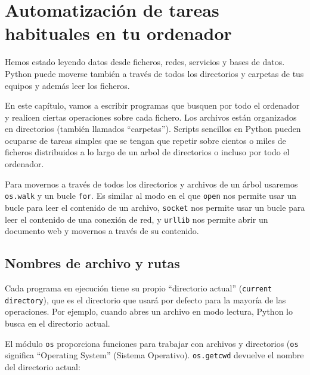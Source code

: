
\chapter{Automatización de tareas habituales en tu ordenador}

Hemos estado leyendo datos desde ficheros, redes, servicios y
bases de datos. Python puede moverse también a través de todos los
directorios y carpetas de tus equipos y además leer
los ficheros.

En este capítulo, vamos a escribir programas que busquen
por todo el ordenador y
realicen ciertas operaciones sobre cada fichero.
Los archivos están organizados en directorios (también llamados ``carpetas'').
Scripts sencillos en Python
pueden ocuparse de tareas simples que se tengan que repetir
sobre cientos o miles de ficheros
distribuidos a lo largo de un arbol de directorios o incluso por todo el ordenador.

Para movernos a través de todos los directorios y archivos de un árbol usaremos
{\tt os.walk} y un bucle {\tt for}. Es similar al modo en el que
{\tt open} nos permite usar un bucle para leer el contenido de un archivo,
{\tt socket} nos permite usar un bucle para leer el contenido de una conexión de red, y
{\tt urllib} nos permite abrir un documento web y movernos a través de su contenido. 

\section{Nombres de archivo y rutas}
\label{paths}


Cada programa en ejecución tiene su propio ``directorio actual'' ({\tt current directory}), que es el directorio que
usará por defecto para la mayoría de las operaciones. Por ejemplo, cuando abres un archivo
en modo lectura, Python lo busca en el directorio actual.


El módulo {\tt os} proporciona funciones para trabajar con archivos y
directorios ({\tt os} significa ``Operating System'' (Sistema Operativo).
{\tt os.getcwd} devuelve el nombre del directorio actual:



